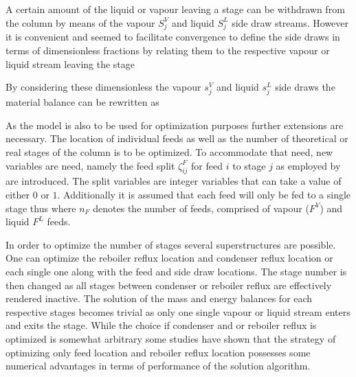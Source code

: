         A certain amount of the liquid or vapour leaving a stage can be withdrawn from the column by means
        of the vapour $S^V_j$ and liquid $S^L_j$ side draw streams. However it is convenient and seemed
        to facilitate convergence to define the side draws in terms of dimensionless fractions by relating them
        to the respective vapour or liquid stream leaving the stage


        By considering these dimensionless the vapour $s_j^V$ and liquid $s_j^L$ side draws the material
        balance can be rewritten as

        As the model is also to be used for optimization purposes further extensions are necessary.
        The location of individual feeds as well as the number of theoretical or real stages of the
        column is to be optimized. To accommodate that need, new variables are need, namely the feed
        split $\zeta_{ij}^F$ for feed $i$ to stage $j$ as employed by \cite{Dunnebier.1999} are introduced.
        The split variables are integer variables that can take a value of either $0$ or $1$. Additionally it is
        assumed that each feed will only be fed to a single stage thus
        where $n_F$ denotes the number of feeds, comprised of vapour ($F^V$) and liquid $F^L$ feeds.

        In order to optimize the number of stages several superstructures are possible. One can
        optimize the reboiler reflux location and condenser reflux location or each single one
        along with the feed and side draw locations. The stage number is then changed as all stages
        between condenser or reboiler reflux are effectively rendered inactive. The solution of
        the mass and energy balances for each respective stages becomes trivial as only one single
        vapour or liquid stream enters and exits the stage. While the choice if condenser and or reboiler
        reflux is optimized is somewhat arbitrary some studies have shown \cite{Grossmann.2005} that
        the strategy of optimizing only feed location and reboiler reflux location possesses some
        numerical advantages in terms of performance of the solution algorithm.

